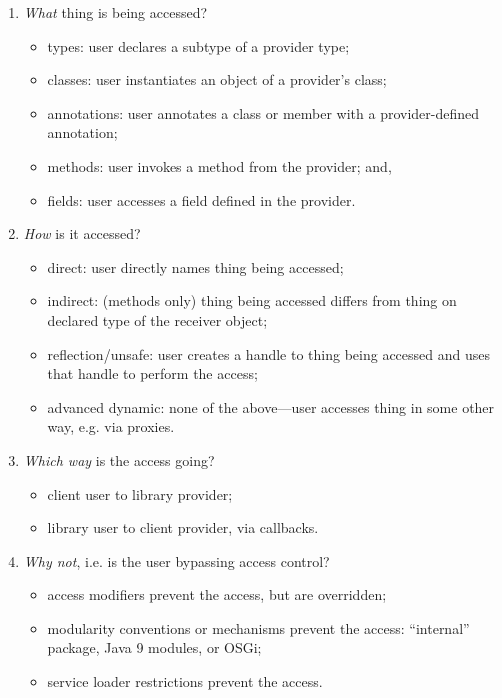 \begin{enumerate}
\item \emph{What} thing is being accessed?
\begin{itemize}
    \item types: user declares a subtype of a provider type;
    \item classes: user instantiates an object of a provider's class;
    \item annotations: user annotates a class or member with a provider-defined annotation;
    \item methods: user invokes a method from the provider; and,
    \item fields: user accesses a field defined in the provider.
\end{itemize}
\item \emph{How} is it accessed?
\begin{itemize}
    \item direct: user directly names thing being accessed;
    \item indirect: (methods only) thing being accessed differs from thing on declared type of the receiver object;
    \item reflection/unsafe: user creates a handle to thing being accessed and uses that handle to perform the access;
    \item advanced dynamic: none of the above---user accesses thing in some other way, e.g. via proxies.%
\end{itemize}
\item \emph{Which way} is the access going?
\begin{itemize}
    \item client user to library provider;
    \item library user to client provider, via callbacks.
\end{itemize}
\item \emph{Why not}, i.e. is the user bypassing access control?
\begin{itemize}
    \item access modifiers prevent the access, but are overridden;
    \item modularity conventions or mechanisms prevent the access: ``internal'' package, Java 9 modules, or OSGi;
    \item service loader restrictions prevent the access.
\end{itemize}
\end{enumerate}

